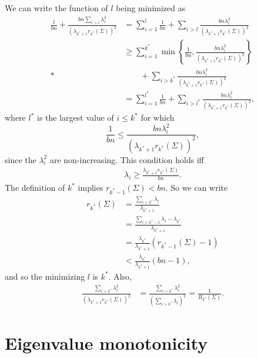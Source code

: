 \documentclass[11pt,notitlepage]{article}
\begin{document}
  We can write the function of $l$ being minimized as
    \begin{align*}
      \frac{l}{bn} + \frac{bn\sum_{i>l}\lambda_i^2}
      {\left(\lambda_{k^*+1}r_{k^*}(\Sigma)\right)^2}
        & = \sum_{i=1}^l \frac{1}{bn} +\sum_{i>l}
          \frac{bn\lambda_i^2}
          {\left(\lambda_{k^*+1}r_{k^*}(\Sigma)\right)^2} \\
        & \ge \sum_{i=1}^{k^*} \min\left\{\frac{1}{bn},
          \frac{bn\lambda_i^2}
          {\left(\lambda_{k^*+1}r_{k^*}(\Sigma)\right)^2}\right\} \\*
        & \qquad {}
          + \sum_{i>k^*} \frac{bn\lambda_i^2}
          {\left(\lambda_{k^*+1}r_{k^*}(\Sigma)\right)^2} \\
        & = \sum_{i=1}^{l^*} \frac{1}{bn} +\sum_{i>l^*}
         \frac{bn\lambda_i^2}
        {\left(\lambda_{k^*+1}r_{k^*}(\Sigma)\right)^2},
    \end{align*}
  where $l^*$ is the largest value of $i\le k^*$ for which 
    \[
      \frac{1}{bn} \le
         \frac{bn\lambda_i^2}
        {\left(\lambda_{k^*+1}r_{k^*}(\Sigma)\right)^2},
    \]
  since the $\lambda_i^2$ are non-increasing.
  This condition 
  holds iff
    \begin{align*}
      \lambda_i
        \ge \frac{\lambda_{k^*+1}r_{k^*}(\Sigma)}{bn}.
    \end{align*}
  The definition of $k^*$ implies $r_{k^*-1}(\Sigma)<bn$. So we can write
    \begin{align*}
      r_{k^*}(\Sigma)
        & = \frac{\sum_{i>k^*}\lambda_i}{\lambda_{k^*+1}} \\
        & = \frac{\sum_{i>k^*-1}\lambda_i-\lambda_{k^*}}{\lambda_{k^*+1}} \\
        & = \frac{\lambda_{k^*}}{\lambda_{k^*+1}} (r_{k^*-1}(\Sigma) -1) \\
        & < \frac{\lambda_{k^*}}{\lambda_{k^*+1}}(bn-1),
    \end{align*}
  and so
  the minimizing $l$ is $k^*$. Also,
    \begin{align*}
      \frac{\sum_{i>k^*}\lambda_i^2} {\left(\lambda_{k^*+1}r_{k^*}(\Sigma)\right)^2}
        & = \frac{\sum_{i>k^*}\lambda_i^2}{\left(\sum_{i>k^*}\lambda_i\right)^2}
        = \frac{1}{R_{k^*}(\Sigma)}.
    \end{align*}

\section{Eigenvalue monotonicity}
\end{document}

